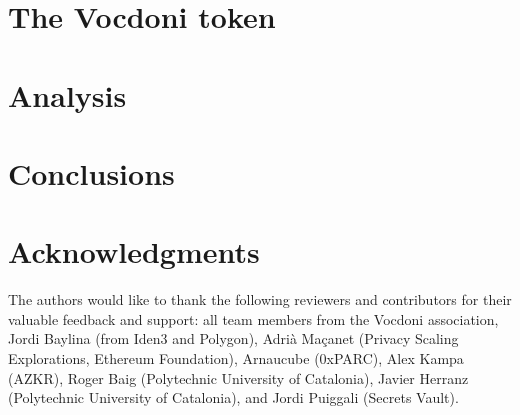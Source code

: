 \documentclass[runningheads, draft]{llncs}
\begin{document}
\section{The Vocdoni token}
\label{sec:token}


\section{Analysis}
\label{sec:analysis}


\section{Conclusions}
\label{sec:conclusions}


\section*{Acknowledgments}
\label{sec:acknowledgments}

The authors would like to thank the following reviewers and contributors for their valuable feedback and support: all team members from the Vocdoni association, Jordi Baylina (from Iden3 and Polygon), Adrià Maçanet (Privacy Scaling Explorations, Ethereum Foundation), Arnaucube (0xPARC), Alex Kampa (AZKR), Roger Baig (Polytechnic University of Catalonia), Javier Herranz (Polytechnic University of Catalonia), and Jordi Puiggali (Secrets Vault).





\end{document}
